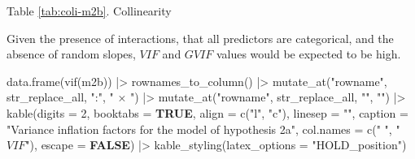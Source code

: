 \documentclass[
  bookmarksnumbered]{article}
\newenvironment{Shaded}{\begin{snugshade}}{\end{snugshade}}
\newcommand{\AttributeTok}[1]{\textcolor[rgb]{0.80,0.80,0.80}{#1}}
\newcommand{\ConstantTok}[1]{\textcolor[rgb]{0.86,0.64,0.64}{\textbf{#1}}}
\newcommand{\DecValTok}[1]{\textcolor[rgb]{0.86,0.86,0.80}{#1}}
\newcommand{\FunctionTok}[1]{\textcolor[rgb]{0.94,0.94,0.56}{#1}}
\newcommand{\NormalTok}[1]{\textcolor[rgb]{0.80,0.80,0.80}{#1}}
\newcommand{\SpecialCharTok}[1]{\textcolor[rgb]{0.86,0.64,0.64}{#1}}
\newcommand{\StringTok}[1]{\textcolor[rgb]{0.80,0.58,0.58}{#1}}
\begin{document}
Table \ref{tab:coli-m2b}. Collinearity

Given the presence of interactions, that all predictors are categorical, and the absence of random slopes, \(VIF\) and \(GVIF\) values would be expected to be high.

\begin{Shaded}
\begin{Highlighting}[]
\FunctionTok{data.frame}\NormalTok{(}\FunctionTok{vif}\NormalTok{(m2b)) }\SpecialCharTok{|\textgreater{}} 
  \FunctionTok{rownames\_to\_column}\NormalTok{() }\SpecialCharTok{|\textgreater{}} 
  \FunctionTok{mutate\_at}\NormalTok{(}\StringTok{"rowname"}\NormalTok{, str\_replace\_all, }\StringTok{":"}\NormalTok{, }\StringTok{" × "}\NormalTok{) }\SpecialCharTok{|\textgreater{}}
  \FunctionTok{mutate\_at}\NormalTok{(}\StringTok{"rowname"}\NormalTok{, str\_replace\_all, }\StringTok{"\textasciigrave{}"}\NormalTok{, }\StringTok{""}\NormalTok{) }\SpecialCharTok{|\textgreater{}} 
  \FunctionTok{kable}\NormalTok{(}\AttributeTok{digits =} \DecValTok{2}\NormalTok{,}
        \AttributeTok{booktabs =} \ConstantTok{TRUE}\NormalTok{,}
        \AttributeTok{align =} \FunctionTok{c}\NormalTok{(}\StringTok{"l"}\NormalTok{, }\StringTok{"c"}\NormalTok{),}
        \AttributeTok{linesep =} \StringTok{""}\NormalTok{,}
        \AttributeTok{caption =} \StringTok{"Variance inflation factors for the model of hypothesis 2a"}\NormalTok{,}
        \AttributeTok{col.names =} \FunctionTok{c}\NormalTok{(}\StringTok{" "}\NormalTok{,}
                      \StringTok{"$VIF$"}\NormalTok{),}
        \AttributeTok{escape =} \ConstantTok{FALSE}\NormalTok{) }\SpecialCharTok{|\textgreater{}}
  \FunctionTok{kable\_styling}\NormalTok{(}\AttributeTok{latex\_options =} \StringTok{"HOLD\_position"}\NormalTok{)}
\end{Highlighting}
\end{Shaded}
\end{document}
